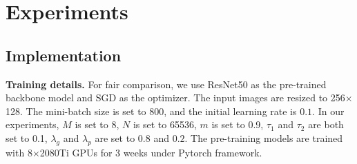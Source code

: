 \documentclass[10pt,twocolumn,letterpaper]{article}
\newcommand{\tcr}{\textcolor{red}}
\begin{document}









\section{Experiments}

\subsection{Implementation}

\noindent\textbf{Training details.} 
For fair comparison, we use ResNet50 as the pre-trained backbone model and SGD as the optimizer.
The input images are resized to 256$\times$128. The mini-batch size is set to 800, and the initial learning rate is $0.1$. In our experiments, $M$ is set to $8$, $N$ is set to 65536, $m$ is set to 0.9, $\tau_1$ and $\tau_2$ are both set to 0.1, $\lambda_g$ and $\lambda_p$ are set to $0.8$ and $0.2$.  The pre-training models are trained with 8$\times$2080Ti GPUs for 3 weeks under Pytorch framework.
\end{document}
